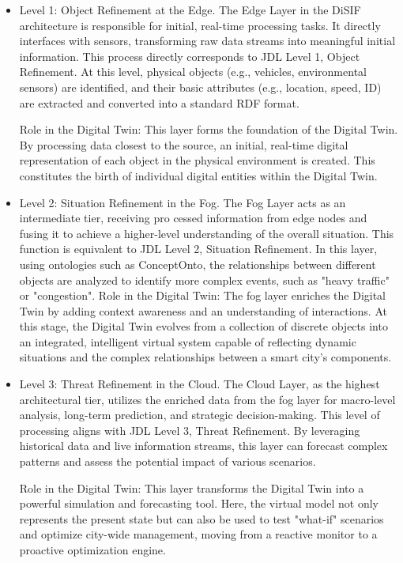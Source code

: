 \documentclass[5p,times]{elsarticle}
\begin{document}
\begin{itemize}
  \item Level 1: Object Refinement at the Edge.  The Edge Layer in the DiSIF architecture is responsible for
  initial, real-time processing tasks. It directly interfaces with
  sensors, transforming raw data streams into meaningful initial
  information. This process directly corresponds to JDL Level 1,
  Object Refinement. At this level, physical objects (e.g., vehicles, environmental sensors) are identified, and their basic attributes
  (e.g., location, speed, ID) are extracted and converted into a standard RDF format.
  
  Role in the Digital Twin: This layer forms the foundation
  of the Digital Twin. By processing data closest to the source,
  an initial, real-time digital representation of each object in the
  physical environment is created. This constitutes the birth of
  individual digital entities within the Digital Twin.

  \item Level 2: Situation Refinement in the Fog. The Fog Layer acts as an intermediate tier, receiving pro
  cessed information from edge nodes and fusing it to achieve a
   higher-level understanding of the overall situation. This function
   is equivalent to JDL Level 2, Situation Refinement. In this layer,
   using ontologies such as ConceptOnto, the relationships between
   different objects are analyzed to identify more complex events,
   such as "heavy traffic" or "congestion".
   Role in the Digital Twin: The fog layer enriches the Digital
   Twin by adding context awareness and an understanding of
   interactions. At this stage, the Digital Twin evolves from a
   collection of discrete objects into an integrated, intelligent virtual
   system capable of reflecting dynamic situations and the complex
   relationships between a smart city’s components.

   \item Level 3: Threat Refinement in the Cloud. The Cloud Layer, as the highest architectural tier, utilizes
   the enriched data from the fog layer for macro-level analysis,
   long-term prediction, and strategic decision-making. This level
   of processing aligns with JDL Level 3, Threat Refinement. By
   leveraging historical data and live information streams, this layer
   can forecast complex patterns and assess the potential impact of
   various scenarios.

   Role in the Digital Twin: This layer transforms the Digital Twin into a powerful simulation and forecasting tool. Here,
   the virtual model not only represents the present state but can
   also be used to test "what-if" scenarios and optimize city-wide management, moving from a reactive monitor to a proactive
   optimization engine.



\end{itemize}
\end{document}
